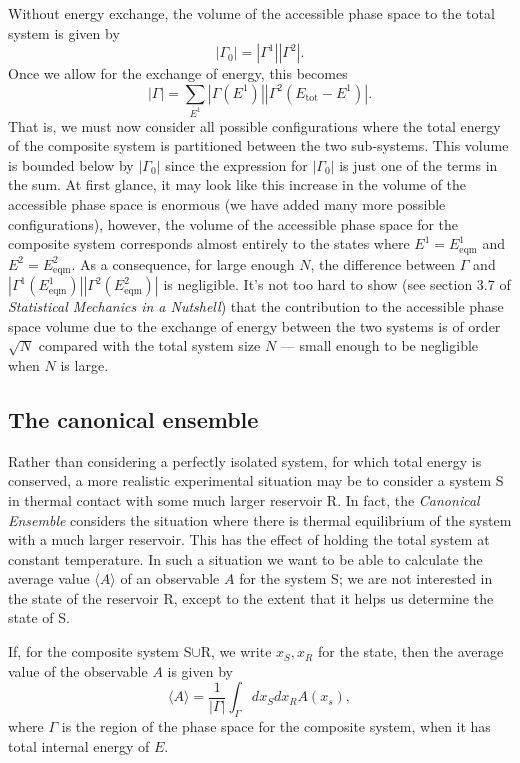 \documentclass{article}
\begin{document}
Without energy exchange, the volume of the accessible phase space to the total system is given by
$$
	|\Gamma_0| = |\Gamma^1||\Gamma^2|.
$$
Once we allow for the exchange of energy, this becomes
$$
	|\Gamma| = \sum_{E^1}|\Gamma(E^1)||\Gamma^2(E_\text{tot}-E^1)|.
$$
That is, we must now consider all possible configurations where the total energy of the composite system is partitioned between the two sub-systems. This volume is bounded below by $|\Gamma_0|$ since the expression for $|\Gamma_0|$ is just one of the terms in the sum. At first glance, it may look like this increase in the volume of the accessible phase space is enormous (we have added many more possible configurations), however, the volume of the accessible phase space for the composite system corresponds almost entirely to the states where $E^1=E^1_\text{eqm}$ and $E^2=E^2_\text{eqm}$. As a consequence, for large enough $N$, the difference between $\Gamma$ and $|\Gamma^1(E^1_\text{eqm})||\Gamma^2(E^2_\text{eqm})|$ is negligible. It's not too hard to show (see section 3.7 of \emph{Statistical Mechanics in a Nutshell}) that the contribution to the accessible phase space volume due to the exchange of energy between the two systems is of order $\sqrt{N}$ compared with the total system size $N$ --- small enough to be negligible when $N$ is large.

\subsection{The canonical ensemble}

Rather than considering a perfectly isolated system, for which total energy is conserved, a more realistic experimental situation may be to consider a system S in thermal contact with some much larger reservoir R. In fact, the {\it Canonical Ensemble} considers the situation where there is thermal equilibrium of the system with a much larger reservoir. This has the effect of holding the total system at constant temperature. In such a situation we want to be able to calculate the average value $\langle A\rangle$ of an observable $A$ for the system S; we are not interested in the state of the reservoir R, except to the extent that it helps us determine the state of S.

If, for the composite system S$\cup$R, we write $x_S,x_R$ for the state, then the average value of the observable $A$ is given by
$$
	\langle A\rangle = \frac{1}{|\Gamma|}\int_{\Gamma}dx_Sdx_RA(x_s),
$$
where $\Gamma$ is the region of the phase space for the composite system, when it has total internal energy of $E$.
\end{document}

